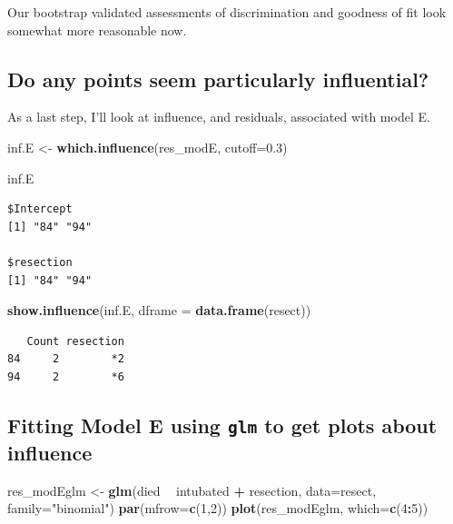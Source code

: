 \documentclass[]{book}
\newenvironment{Shaded}{\begin{snugshade}}{\end{snugshade}}
\newcommand{\KeywordTok}[1]{\textcolor[rgb]{0.13,0.29,0.53}{\textbf{#1}}}
\newcommand{\DataTypeTok}[1]{\textcolor[rgb]{0.13,0.29,0.53}{#1}}
\newcommand{\DecValTok}[1]{\textcolor[rgb]{0.00,0.00,0.81}{#1}}
\newcommand{\FloatTok}[1]{\textcolor[rgb]{0.00,0.00,0.81}{#1}}
\newcommand{\StringTok}[1]{\textcolor[rgb]{0.31,0.60,0.02}{#1}}
\newcommand{\OperatorTok}[1]{\textcolor[rgb]{0.81,0.36,0.00}{\textbf{#1}}}
\newcommand{\NormalTok}[1]{#1}
\theoremstyle{definition}
\theoremstyle{definition}
\theoremstyle{definition}
\theoremstyle{remark}
\begin{document}
Our bootstrap validated assessments of discrimination and goodness of
fit look somewhat more reasonable now.

\subsection{Do any points seem particularly
influential?}\label{do-any-points-seem-particularly-influential}

As a last step, I'll look at influence, and residuals, associated with
model E.

\begin{Shaded}
\begin{Highlighting}[]
\NormalTok{inf.E <-}\StringTok{ }\KeywordTok{which.influence}\NormalTok{(res_modE, }\DataTypeTok{cutoff=}\FloatTok{0.3}\NormalTok{)}

\NormalTok{inf.E}
\end{Highlighting}
\end{Shaded}

\begin{verbatim}
$Intercept
[1] "84" "94"

$resection
[1] "84" "94"
\end{verbatim}

\begin{Shaded}
\begin{Highlighting}[]
\KeywordTok{show.influence}\NormalTok{(inf.E, }\DataTypeTok{dframe =} \KeywordTok{data.frame}\NormalTok{(resect))}
\end{Highlighting}
\end{Shaded}

\begin{verbatim}
   Count resection
84     2        *2
94     2        *6
\end{verbatim}

\subsection{\texorpdfstring{Fitting Model E using \texttt{glm} to get
plots about
influence}{Fitting Model E using glm to get plots about influence}}\label{fitting-model-e-using-glm-to-get-plots-about-influence}

\begin{Shaded}
\begin{Highlighting}[]
\NormalTok{res_modEglm <-}\StringTok{ }\KeywordTok{glm}\NormalTok{(died }\OperatorTok{~}\StringTok{ }\NormalTok{intubated }\OperatorTok{+}\StringTok{ }\NormalTok{resection, }
                  \DataTypeTok{data=}\NormalTok{resect, }\DataTypeTok{family=}\StringTok{"binomial"}\NormalTok{)}
\KeywordTok{par}\NormalTok{(}\DataTypeTok{mfrow=}\KeywordTok{c}\NormalTok{(}\DecValTok{1}\NormalTok{,}\DecValTok{2}\NormalTok{))}
\KeywordTok{plot}\NormalTok{(res_modEglm, }\DataTypeTok{which=}\KeywordTok{c}\NormalTok{(}\DecValTok{4}\OperatorTok{:}\DecValTok{5}\NormalTok{))}
\end{Highlighting}
\end{Shaded}
\end{document}
